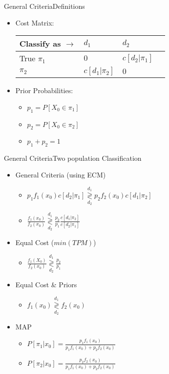 \documentclass[aspectratio=169,10pt,t]{beamer}
\newcommand\gldec[2]{
	\underset{#2}{\overset{#1}{\gtrless}}
}
\begin{document}
\begin{frame}{General Criteria}{Definitions}
    \begin{itemize}
        \item Cost Matrix: 
        \begin{table}[h]
        \begin{tabular}{@{}llll@{}}
        \toprule
         Classify as $\rightarrow$   & $d_1$          & $d_2$          \\ \midrule
        True $\pi_1$ & $0$ & $c[d_2 | \pi_1]$ \\
        $\pi_2$ & $c[d_1 | \pi_2]$ & $0$ \\ \midrule 
        \end{tabular}
        \end{table}
        \item Prior Probabilities: 
        \begin{itemize}
            \item $p_1 = P[X_0 \in \pi_1] $
            \item $p_2 = P[X_0 \in \pi_2] $
            \item $p_1 + p_2 = 1 $
        \end{itemize}
    \end{itemize}
\end{frame}

\begin{frame}{General Criteria}{Two population Classification}
	\begin{itemize}
        \item General Criteria (using ECM)
        \begin{itemize}
					\item $ p_1 f_1(x_0) c[d_2 | \pi_1] \gldec{d_1}{d_2} p_2 f_2(x_0) c[d_1 | \pi_2]$
            \item $ \frac{f_1(x_0)}{f_2(x_0)} \gldec{d_1}{d_2} \frac{p_2}{p_1} \frac{c[d_1 | \pi_2]}{c[d_2 | \pi_1]}$
        \end{itemize}
				\pause
        \item Equal Cost ($min(TPM)$)
        \begin{itemize}
            \item $ \frac{f_1(X_0)}{f_2(x_0)}  \gldec{d_1}{d_2} \frac{p_2}{p_1}$
        \end{itemize}
				\pause
        \item Equal Cost \& Priors
        \begin{itemize}
            \item $ f_1(x_0)  \gldec{d_1}{d_2} f_2(x_0)$
        \end{itemize}
				\pause
        \item MAP
        \begin{itemize}
            \item $P[\pi_1 | x_0 ] = \frac{p_1 f_1(x_0)}{p_1 f_1(x_0) + p_2 f_2(x_0)}$
            \item $P[\pi_2 | x_0 ] = \frac{p_2 f_2(x_0)}{p_1 f_1(x_0) + p_2 f_2(x_0)}$
        \end{itemize}
			\end{itemize}
\end{frame}
\end{document}

